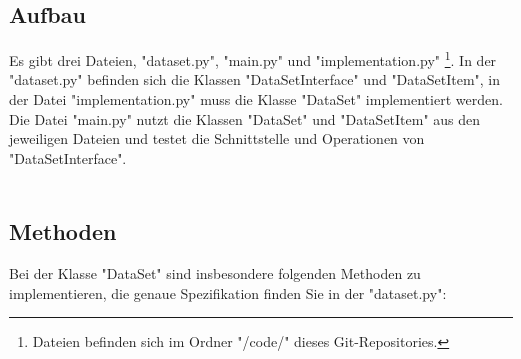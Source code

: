 \documentclass[titlepage]{article}
\begin{document}
\subsection{Aufbau}
Es gibt drei Dateien, "dataset.py", "main.py" und "implementation.py" 
\footnote{Dateien befinden sich im Ordner "/code/" dieses Git-Repositories.}.
In der "dataset.py" befinden sich die Klassen "DataSetInterface" und "DataSetItem",
in der Datei "implementation.py" muss die Klasse "DataSet" implementiert werden.
Die Datei "main.py" nutzt die Klassen "DataSet" und "DataSetItem" aus den jeweiligen Dateien und testet die Schnittstelle und Operationen von "DataSetInterface".\\
\\
\subsection{Methoden}
Bei der Klasse "DataSet" sind insbesondere folgenden Methoden zu implementieren, die genaue Spezifikation finden Sie in der "dataset.py":\\
\end{document}
